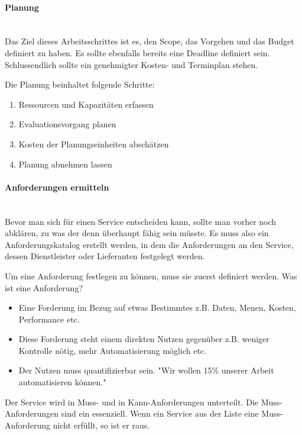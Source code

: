 \documentclass[a4paper, 11pt]{article}
\begin{document}
\paragraph{Planung}\mbox{}\\
Das Ziel dieses Arbeitsschrittes ist es, den Scope, das Vorgehen und das Budget definiert zu haben. Es sollte ebenfalls bereits eine Deadline definiert sein. Schlussendlich sollte ein genehmigter Kosten- und Terminplan stehen.

Die Planung beinhaltet folgende Schritte:

\begin{enumerate}
	\item Ressourcen und Kapazitäten erfassen
	\item Evaluationsvorgang planen
	\item Kosten der Planungseinheiten abschätzen
	\item Planung abnehmen lassen
\end{enumerate}

\paragraph{Anforderungen ermitteln}\mbox{}\\
Bevor man sich für einen Service entscheiden kann, sollte man vorher noch abklären, zu was der denn überhaupt fähig sein müsste. Es muss also ein Anforderungskatalog erstellt werden, in dem die Anforderungen an den Service, dessen Dienstleister oder Lieferanten festgelegt werden.
\vspace{10px}

\noindent Um eine Anforderung festlegen zu können, muss sie zuerst definiert werden. Was ist eine Anforderung?

\begin{itemize}
	\item Eine Forderung im Bezug auf etwas Bestimmtes
		\subitem z.B. Daten, Menen, Kosten, Performance etc.
	\item Diese Forderung steht einem direkten Nutzen gegenüber
		\subitem z.B. weniger Kontrolle nötig, mehr Automatisierung möglich etc.
	\item Der Nutzen muss quantifizierbar sein.
		\subitem "Wir wollen 15\% unserer Arbeit automatisieren können."
\end{itemize}

Der Service wird in Muss- und in Kann-Anforderungen unterteilt. Die Muss-Anforderungen sind ein essenziell. Wenn ein Service aus der Liste eine Muss-Anforderung nicht erfüllt, so ist er raus. 
\end{document}
